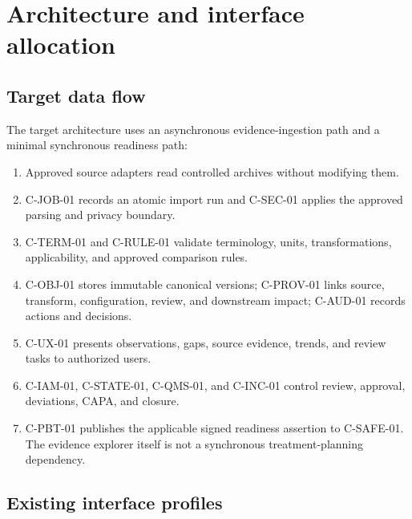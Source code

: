 \documentclass[11pt,letterpaper]{article}
\begin{document}
\section{Architecture and interface allocation}

\subsection{Target data flow}

The target architecture uses an asynchronous evidence-ingestion path and a minimal synchronous readiness path:

\begin{enumerate}
\item Approved source adapters read controlled archives without modifying them.
\item C-JOB-01 records an atomic import run and C-SEC-01 applies the approved parsing and privacy boundary.
\item C-TERM-01 and C-RULE-01 validate terminology, units, transformations, applicability, and approved comparison rules.
\item C-OBJ-01 stores immutable canonical versions; C-PROV-01 links source, transform, configuration, review, and downstream impact; C-AUD-01 records actions and decisions.
\item C-UX-01 presents observations, gaps, source evidence, trends, and review tasks to authorized users.
\item C-IAM-01, C-STATE-01, C-QMS-01, and C-INC-01 control review, approval, deviations, CAPA, and closure.
\item C-PBT-01 publishes the applicable signed readiness assertion to C-SAFE-01. The evidence explorer itself is not a synchronous treatment-planning dependency.
\end{enumerate}

\subsection{Existing interface profiles}
\end{document}
